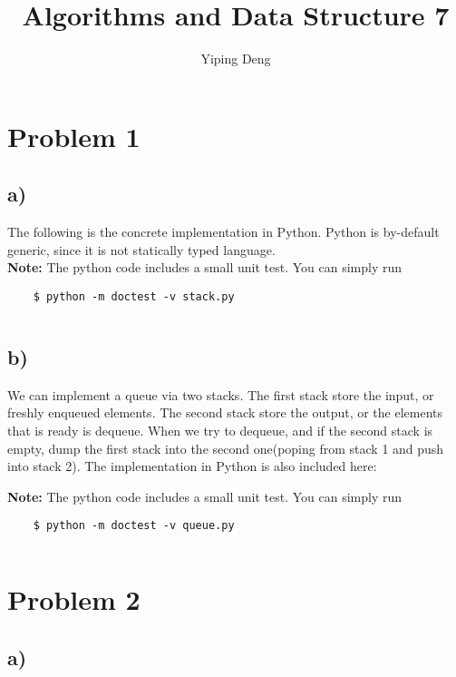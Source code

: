 \documentclass{article}
\newcommand{\hwnumber}{7}
\begin{document}
\title{Algorithms and Data Structure \hwnumber}
\author{Yiping Deng}
\maketitle
\thispagestyle{fancy}
\section*{Problem 1}
\subsection*{a)}
The following is the concrete implementation in Python. Python is by-default generic, since it is not statically typed language. \\
\textbf{Note:} The python code includes a small unit test. You can simply run
\begin{verbatim}
    $ python -m doctest -v stack.py
\end{verbatim}
\inputminted{Python}{stack.py}
\subsection*{b)}
We can implement a queue via two stacks. The first stack store the input, or freshly enqueued elements. The second stack store the output, or the elements
that is ready is dequeue.
When we try to dequeue, and if the second stack is empty, dump the first stack into the second one(poping from stack 1 and push into stack 2).
The implementation in Python is also included here:

\textbf{Note:} The python code includes a small unit test. You can simply run
\begin{verbatim}
    $ python -m doctest -v queue.py
\end{verbatim}
\inputminted{Python}{queue.py}
\section*{Problem 2}
\subsection*{a)}
\end{document}
